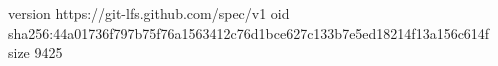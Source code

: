 version https://git-lfs.github.com/spec/v1
oid sha256:44a01736f797b75f76a1563412c76d1bce627c133b7e5ed18214f13a156c614f
size 9425
